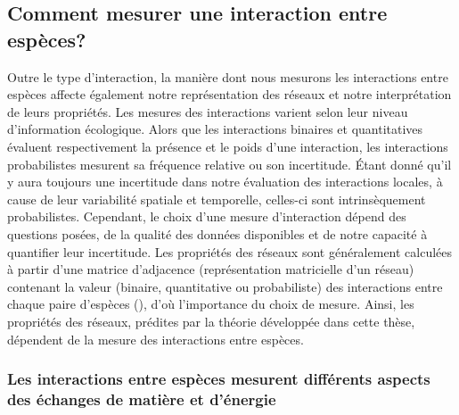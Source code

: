 \subsection{Comment mesurer une interaction entre espèces?} 

Outre le type d'interaction, la manière dont nous mesurons les interactions
entre espèces affecte également notre représentation des réseaux et notre
interprétation de leurs propriétés. Les mesures des interactions varient selon
leur niveau d'information écologique. Alors que les interactions binaires et
quantitatives évaluent respectivement la présence et le poids d'une interaction,
les interactions probabilistes mesurent sa fréquence relative ou son
incertitude. Étant donné qu'il y aura toujours une incertitude dans notre
évaluation des interactions locales, à cause de leur variabilité spatiale et
temporelle, celles-ci sont intrinsèquement probabilistes. Cependant, le choix
d'une mesure d'interaction dépend des questions posées, de la qualité des
données disponibles et de notre capacité à quantifier leur incertitude. Les
propriétés des réseaux sont généralement calculées à partir d'une matrice
d'adjacence (représentation matricielle d'un réseau) contenant la valeur
(binaire, quantitative ou probabiliste) des interactions entre chaque paire
d'espèces (\cite{Delmas2019Analysing}), d'où l'importance du choix de mesure.
Ainsi, les propriétés des réseaux, prédites par la théorie développée dans cette
thèse, dépendent de la mesure des interactions entre espèces. 

\subsubsection{Les interactions entre espèces mesurent différents aspects des échanges de matière et d'énergie} 

